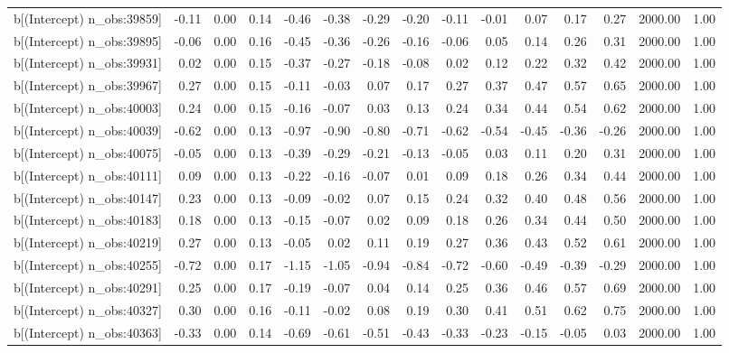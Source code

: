 \begin{table}[ht]
\begin{tabular}{rrrrrrrrrrrrrrr}
  b[(Intercept) n\_obs:39859] & -0.11 & 0.00 & 0.14 & -0.46 & -0.38 & -0.29 & -0.20 & -0.11 & -0.01 & 0.07 & 0.17 & 0.27 & 2000.00 & 1.00 \\ 
  b[(Intercept) n\_obs:39895] & -0.06 & 0.00 & 0.16 & -0.45 & -0.36 & -0.26 & -0.16 & -0.06 & 0.05 & 0.14 & 0.26 & 0.31 & 2000.00 & 1.00 \\ 
  b[(Intercept) n\_obs:39931] & 0.02 & 0.00 & 0.15 & -0.37 & -0.27 & -0.18 & -0.08 & 0.02 & 0.12 & 0.22 & 0.32 & 0.42 & 2000.00 & 1.00 \\ 
  b[(Intercept) n\_obs:39967] & 0.27 & 0.00 & 0.15 & -0.11 & -0.03 & 0.07 & 0.17 & 0.27 & 0.37 & 0.47 & 0.57 & 0.65 & 2000.00 & 1.00 \\ 
  b[(Intercept) n\_obs:40003] & 0.24 & 0.00 & 0.15 & -0.16 & -0.07 & 0.03 & 0.13 & 0.24 & 0.34 & 0.44 & 0.54 & 0.62 & 2000.00 & 1.00 \\ 
  b[(Intercept) n\_obs:40039] & -0.62 & 0.00 & 0.13 & -0.97 & -0.90 & -0.80 & -0.71 & -0.62 & -0.54 & -0.45 & -0.36 & -0.26 & 2000.00 & 1.00 \\ 
  b[(Intercept) n\_obs:40075] & -0.05 & 0.00 & 0.13 & -0.39 & -0.29 & -0.21 & -0.13 & -0.05 & 0.03 & 0.11 & 0.20 & 0.31 & 2000.00 & 1.00 \\ 
  b[(Intercept) n\_obs:40111] & 0.09 & 0.00 & 0.13 & -0.22 & -0.16 & -0.07 & 0.01 & 0.09 & 0.18 & 0.26 & 0.34 & 0.44 & 2000.00 & 1.00 \\ 
  b[(Intercept) n\_obs:40147] & 0.23 & 0.00 & 0.13 & -0.09 & -0.02 & 0.07 & 0.15 & 0.24 & 0.32 & 0.40 & 0.48 & 0.56 & 2000.00 & 1.00 \\ 
  b[(Intercept) n\_obs:40183] & 0.18 & 0.00 & 0.13 & -0.15 & -0.07 & 0.02 & 0.09 & 0.18 & 0.26 & 0.34 & 0.44 & 0.50 & 2000.00 & 1.00 \\ 
  b[(Intercept) n\_obs:40219] & 0.27 & 0.00 & 0.13 & -0.05 & 0.02 & 0.11 & 0.19 & 0.27 & 0.36 & 0.43 & 0.52 & 0.61 & 2000.00 & 1.00 \\ 
  b[(Intercept) n\_obs:40255] & -0.72 & 0.00 & 0.17 & -1.15 & -1.05 & -0.94 & -0.84 & -0.72 & -0.60 & -0.49 & -0.39 & -0.29 & 2000.00 & 1.00 \\ 
  b[(Intercept) n\_obs:40291] & 0.25 & 0.00 & 0.17 & -0.19 & -0.07 & 0.04 & 0.14 & 0.25 & 0.36 & 0.46 & 0.57 & 0.69 & 2000.00 & 1.00 \\ 
  b[(Intercept) n\_obs:40327] & 0.30 & 0.00 & 0.16 & -0.11 & -0.02 & 0.08 & 0.19 & 0.30 & 0.41 & 0.51 & 0.62 & 0.75 & 2000.00 & 1.00 \\ 
  b[(Intercept) n\_obs:40363] & -0.33 & 0.00 & 0.14 & -0.69 & -0.61 & -0.51 & -0.43 & -0.33 & -0.23 & -0.15 & -0.05 & 0.03 & 2000.00 & 1.00 \\ 

\end{tabular}
\end{table}
